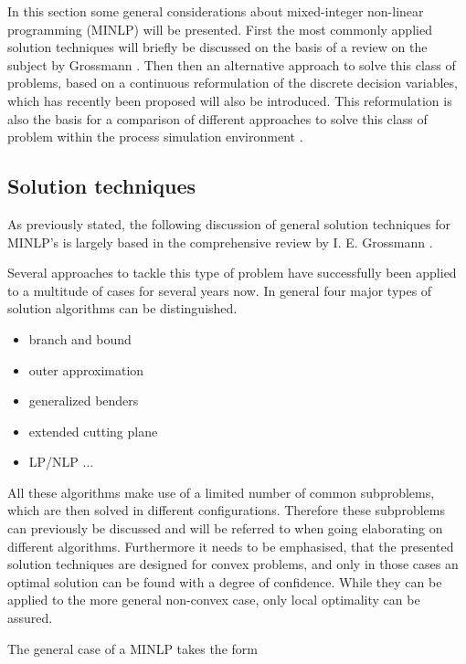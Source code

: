 
In this section some general considerations about mixed-integer non-linear programming (MINLP) will be presented.
First the most commonly applied solution techniques will briefly be discussed on the basis of a review on the
subject by Grossmann \cite{Grossmann.2002}. Then then an alternative approach to solve this class of problems,
based on a continuous reformulation of the discrete decision variables, which has recently been proposed
\cite{Kraemer.2010,Stein.2004} will also be introduced. This reformulation is also the basis for a comparison of different
approaches to solve this class of problem within the process simulation environment \gproms.

    \subsection{Solution techniques}

    As previously stated, the following discussion of general solution techniques for MINLP's is largely based
    in the comprehensive review by I. E. Grossmann \cite{Grossmann.2002}.

    Several approaches to tackle this type of problem have successfully been applied to a multitude of cases for
    several years now. In general four major types of solution algorithms can be distinguished.
    \begin{itemize}
        \item branch and bound
        \item outer approximation
        \item generalized benders
        \item extended cutting plane
        \item LP/NLP ...
    \end{itemize}
    All these algorithms make use of a limited number of common subproblems, which are then solved
    in different configurations. Therefore these subproblems can previously be discussed and will be referred
    to when going elaborating on different algorithms. Furthermore it needs to be emphasised, that the presented
    solution techniques are designed for convex problems, and only in those cases an optimal solution can
    be found with a degree of confidence. While they can be applied to the more general non-convex case, only
    local optimality can be assured.

    The general case of a MINLP takes the form

